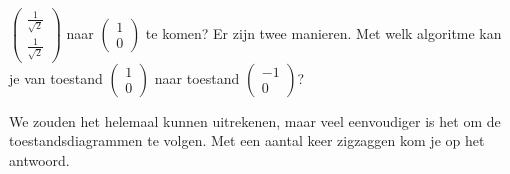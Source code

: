 \documentclass[../../main.tex]{subfiles}
\begin{document}
$\begin{pmatrix}
\tfrac{1}{\sqrt{2}}\\
\tfrac{1}{\sqrt{2}}
\end{pmatrix}
$
naar
$\begin{pmatrix}
1\\
0
\end{pmatrix}
$
te komen? Er zijn twee manieren.
\easy Met welk algoritme kan je van toestand 
$\begin{pmatrix}
1\\
0
\end{pmatrix}
$
naar toestand
$\begin{pmatrix}
-1\\
0
\end{pmatrix}
$?

We zouden het helemaal kunnen uitrekenen, maar veel eenvoudiger is het om de toestandsdiagrammen te volgen. Met een aantal keer zigzaggen kom je op het antwoord.
\end{document}
